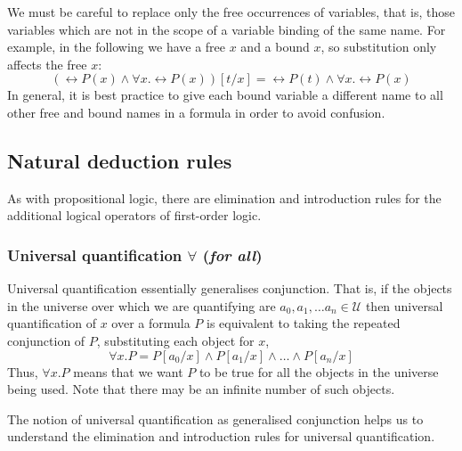 We must be careful to replace only the free
occurrences of variables, that is, those variables which are not in
the scope of a variable binding of the same name. For example, in the
following we have a free $x$ and a bound $x$, so substitution only
affects the free $x$:
%
\begin{equation*}
(\rel{P}(x) \wedge \forall x . \rel{P}(x))[t/x]
= \rel{P}(t) \wedge \forall x . \rel{P}(x)
\end{equation*}
%
In general, it is best practice to give each bound variable a different name
to all other free and bound names in a formula in order to avoid confusion.

\subsection{Natural deduction rules}

As with propositional logic, there are elimination and introduction
rules for the additional logical operators of first-order logic.

\subsubsection{Universal quantification $\forall$ (\emph{for all})}

Universal quantification essentially generalises conjunction.  That
is, if the objects in the universe over which we are quantifying are
$a_0, a_1, \ldots a_n \in \mathcal{U}$ then universal quantification
of $x$ over a formula $P$ is equivalent to taking the repeated
conjunction of $P$, substituting each object for $x$, \ie{}
%
\begin{equation}
\forall x . P = P[a_0/x] \wedge P[a_1/x] \wedge
\ldots \wedge P[a_{n}/x]
\label{eq:forall-meaning}
\end{equation}
%
Thus, $\forall x . P$ means that we want $P$ to be true for
all the objects in the universe being used.
Note that there may be an infinite number of such objects.

The notion of universal quantification as generalised conjunction
helps us to understand the elimination and introduction rules for universal
quantification.

